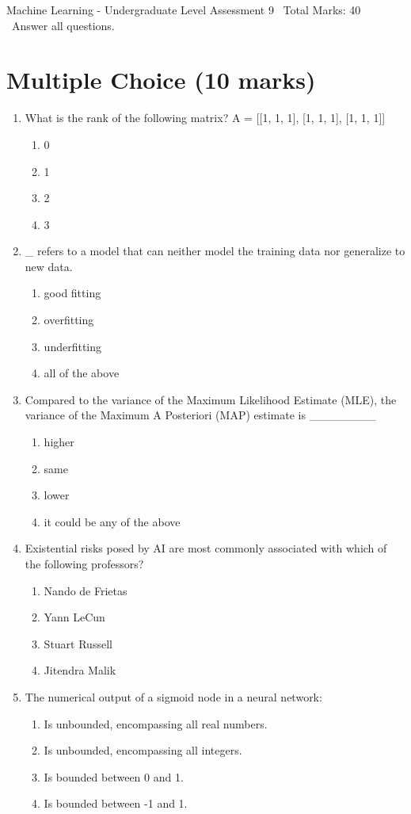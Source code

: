 \documentclass[12pt]{article}
\begin{document}
\begin{center}
Machine Learning - Undergraduate Level Assessment 9 \
Total Marks: 40 \
Answer all questions.
\end{center}

\section*{Multiple Choice (10 marks)}
\begin{enumerate}[label=\arabic*.]
\item What is the rank of the following matrix? A = [[1, 1, 1], [1, 1, 1], [1, 1, 1]]
\begin{enumerate}[label=(\alph*)]
    \item 0
    \item 1
    \item 2
    \item 3
\end{enumerate}
\item \_ refers to a model that can neither model the training data nor generalize to new data.
\begin{enumerate}[label=(\alph*)]
    \item good fitting
    \item overfitting
    \item underfitting
    \item all of the above
\end{enumerate}
\item Compared to the variance of the Maximum Likelihood Estimate (MLE), the variance of the Maximum A Posteriori (MAP) estimate is \_\_\_\_\_\_\_\_
\begin{enumerate}[label=(\alph*)]
    \item higher
    \item same
    \item lower
    \item it could be any of the above
\end{enumerate}
\item Existential risks posed by AI are most commonly associated with which of the following professors?
\begin{enumerate}[label=(\alph*)]
    \item Nando de Frietas
    \item Yann LeCun
    \item Stuart Russell
    \item Jitendra Malik
\end{enumerate}
\item The numerical output of a sigmoid node in a neural network:
\begin{enumerate}[label=(\alph*)]
    \item Is unbounded, encompassing all real numbers.
    \item Is unbounded, encompassing all integers.
    \item Is bounded between 0 and 1.
    \item Is bounded between -1 and 1.
\end{enumerate}
\end{enumerate}
\end{document}
